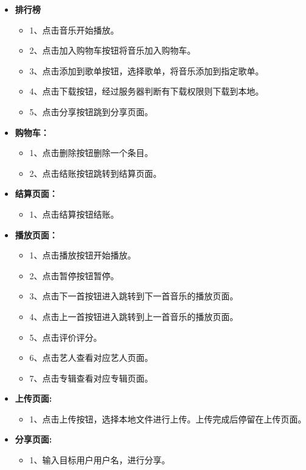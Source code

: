 \begin{itemize}
\begin{itemize}
	\end{itemize}
	\item \textbf{排行榜}
	\begin{itemize}
		\item \textbf{}1、点击音乐开始播放。
		\item \textbf{}2、点击加入购物车按钮将音乐加入购物车。
		\item \textbf{}3、点击添加到歌单按钮，选择歌单，将音乐添加到指定歌单。
		\item \textbf{}4、点击下载按钮，经过服务器判断有下载权限则下载到本地。
		\item \textbf{}5、点击分享按钮跳到分享页面。
	\end{itemize}
	\item \textbf{购物车：}
	\begin{itemize}
		\item \textbf{}1、点击删除按钮删除一个条目。
		\item \textbf{}2、点击结账按钮跳转到结算页面。
	\end{itemize}
	\item \textbf{结算页面：}
	\begin{itemize}
		\item \textbf{}1、点击结算按钮结账。
	\end{itemize}
	\item \textbf{播放页面：}
	\begin{itemize}
		\item \textbf{}1、点击播放按钮开始播放。
		\item \textbf{}2、点击暂停按钮暂停。
		\item \textbf{}3、点击下一首按钮进入跳转到下一首音乐的播放页面。
		\item \textbf{}4、点击上一首按钮进入跳转到上一首音乐的播放页面。
		\item \textbf{}5、点击评价评分。
		\item \textbf{}6、点击艺人查看对应艺人页面。
		\item \textbf{}7、点击专辑查看对应专辑页面。
	\end{itemize}
	\item \textbf{上传页面:}
	\begin{itemize}
		\item \textbf{}1、点击上传按钮，选择本地文件进行上传。上传完成后停留在上传页面。
	\end{itemize}
	\item \textbf{分享页面:}
	\begin{itemize}
		\item \textbf{}1、输入目标用户用户名，进行分享。
	\end{itemize}
\end{itemize}

